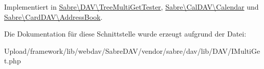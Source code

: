Implementiert in \mbox{\hyperlink{class_sabre_1_1_d_a_v_1_1_tree_multi_get_tester_a41fc2b413304bdfa1bdb6924689ca616}{Sabre\textbackslash{}\+D\+A\+V\textbackslash{}\+Tree\+Multi\+Get\+Tester}}, \mbox{\hyperlink{class_sabre_1_1_cal_d_a_v_1_1_calendar_a9f26acb24cd7aa4059efc96489337a0b}{Sabre\textbackslash{}\+Cal\+D\+A\+V\textbackslash{}\+Calendar}} und \mbox{\hyperlink{class_sabre_1_1_card_d_a_v_1_1_address_book_a2075137110f456a965e38fdb3b254bb6}{Sabre\textbackslash{}\+Card\+D\+A\+V\textbackslash{}\+Address\+Book}}.



Die Dokumentation für diese Schnittstelle wurde erzeugt aufgrund der Datei\+:\begin{DoxyCompactItemize}
\item 
Upload/framework/lib/webdav/\+Sabre\+D\+A\+V/vendor/sabre/dav/lib/\+D\+A\+V/I\+Multi\+Get.\+php\end{DoxyCompactItemize}
